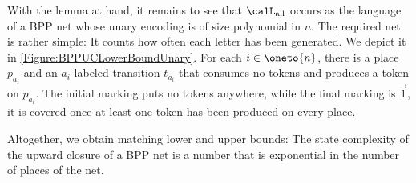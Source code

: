 \documentclass[../../diss.tex]{subfiles}
\begin{document}
With the lemma at hand, it remains to see that $\calL_{\text{all}}$ occurs as the language of a BPP net whose unary encoding is of size polynomial in $n$.
The required net is rather simple: It counts how often each letter has been generated.
We depict it in  \cref{Figure:BPPUCLowerBoundUnary}.
For each $i \in \oneto{n}$, there is a place $p_{a_i}$ and an $a_i$-labeled transition $t_{a_i}$ that consumes no tokens and produces a token on $p_{a_i}$.
The initial marking puts no tokens anywhere, while the final marking is $\vec{1}$, \ie it is covered once at least one token has been produced on every place.

Altogether, we obtain matching lower and upper bounds: The state complexity of the upward closure of a BPP net is a number that is exponential in the number of places of the net.
\end{document}

